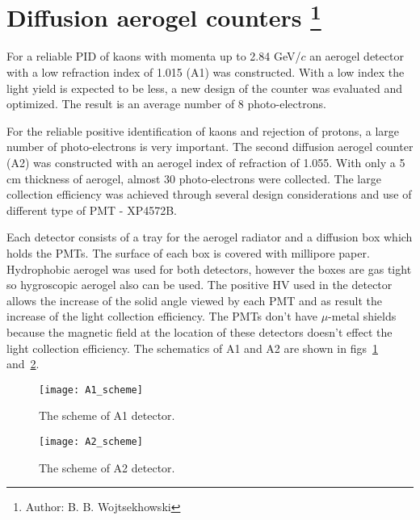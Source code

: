 {\section[Diffusion aerogel counters]{Diffusion aerogel counters 
\footnote{Author: B. B. Wojtsekhowski }
}

For a reliable PID of kaons with momenta up to 2.84 GeV/$c$ 
an aerogel detector with a low refraction index of 1.015 (A1) was constructed.
With a low index the light yield is expected to be less, a new design
of the counter was evaluated and optimized. The result is an
average number of 8 photo-electrons. 

For the reliable positive identification of kaons and rejection of protons, 
a large number of photo-electrons is very important. The second  diffusion
aerogel counter (A2) was constructed with an aerogel index of refraction of 1.055. 
With only a 5 cm thickness of aerogel, almost 30 photo-electrons were collected. 
The large collection efficiency was achieved through several design considerations and
use of different type of PMT - XP4572B.

Each detector consists of a tray for the aerogel radiator and a diffusion box
which holds the PMTs. The surface of each box is covered with millipore
paper. Hydrophobic aerogel was used for both detectors, however the boxes
are gas tight so hygroscopic aerogel also can be used. The positive HV 
used in the detector allows the increase of the solid angle viewed by each PMT
and as result the increase of the light collection efficiency. The PMTs don't have
$\mu$-metal shields because the magnetic field at the location of these
detectors  doesn't effect the light collection efficiency.
The schematics of A1 and A2 are shown in figs~\ref{fig:A1_scheme} 
and~\ref{fig:A2_scheme}.

\begin{figure}[htb]
\begin{center}
  \texttt{[image: A1\_scheme]}
\end{center}
\caption[The scheme of A1 detector] {The scheme of A1 detector.}
\label{fig:A1_scheme}
\end{figure}
%
\begin{figure}[htb]
\begin{center}
  \texttt{[image: A2\_scheme]}
\end{center}
\caption[The scheme of A2 detector] {The scheme of A2 detector.}
\label{fig:A2_scheme}
\end{figure}
%
%
} %

